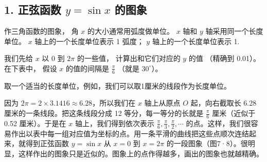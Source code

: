 \subsection{\texorpdfstring{1. 正弦函数 \(y = \sin x\) 的图象}{1. 正弦函数 y = \textbackslash sin x 的图象}}

作三角函数的图象， 角 \(x\) 的大小通常用弧度做单位。 \(x\) 轴和 \(y\)
轴采用同一个长度单位。 \(x\) 轴上的一个长度单位表示 1 弧度； \(y\)
轴上的一个长度单位表示 1.

我们先给 \(x\) 以 0 到 \(2\pi\) 的一些值， 计算出和它们对应的 \(y\) 的值
（精确到 0.01）。 在下表中， 假设 \(x\) 的值的间隔是 \(\frac{\pi}{6}\)
（就是 \(30^{\circ}\)）。

{\centering
\small\setlength{\tabcolsep}{3pt}%
\par
}

取一个适当的长度单位，例如，我们可以取1厘米的线段作为长度单位。

因为 \(2\pi = 2 \times 3.1416 \approx 6.28\)，所以我们在 \(x\)
轴上从原点 \(O\) 起，向右截取长 6.28 厘米的一条线段。把这条线段分成 12
等分，每一等分的长就是 \(\frac{\pi}{6}\) 厘米（近似于 0.52
厘米）。于是在 \(x\) 轴上，我们得到依次表示
\(\frac{\pi}{6}, \frac{\pi}{3}, \frac{\pi}{2}, \cdots\)
的点。这样，我们很容易作出以表中每一组对应值为坐标的点。用一条平滑的曲线把这些点顺次连结起来，就得到正弦函数
\(y = \sin x\) 从 \(x = 0\) 到 \(x = 2\pi\) 的一段图象（图7·8）。很明显，这样作出的图象只是近似的。图象上的点作得越多，画出的图象也就越精确。

